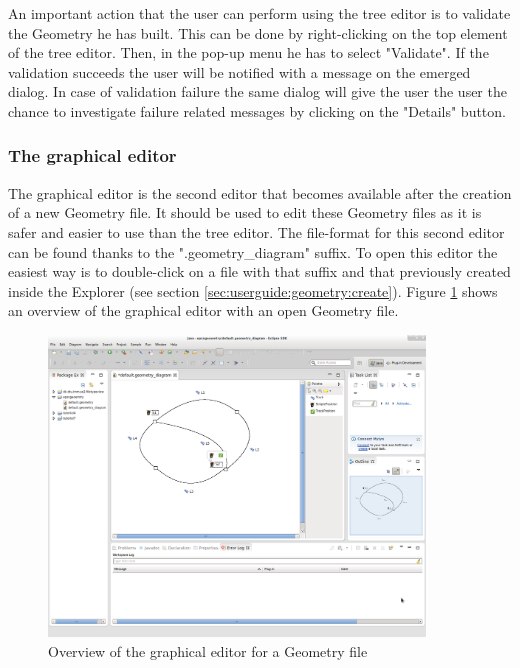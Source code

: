 An important action that the user can perform using the tree editor is to validate the Geometry he has built. This can be done by right-clicking on the top element of the tree editor. Then, in the pop-up menu he has to select "Validate". If the validation succeeds the user will be notified with a message on the emerged dialog. In case of validation failure the same dialog will give the user the user the chance to investigate failure related messages by clicking on the "Details" button. 

\subsubsection{The graphical editor}
\label{sec:userguide:geometry:graphical}
The graphical editor is the second editor that becomes available after the creation of a new Geometry file. It should be used to edit these Geometry files as it is safer and easier to use than the tree editor. The file-format for this second editor can be found thanks to the ".geometry\_diagram" suffix. To open this editor the easiest way is to double-click on a file with that suffix and that previously created inside the Explorer (see section \ref{sec:userguide:geometry:create}). Figure \ref{fig:geometry_overview} shows an overview of the graphical editor with an open Geometry file.

\begin{figure}[htp]
\begin{center}
  \includegraphics[width=10.0cm]{image/geometry_general.png}
  \caption{Overview of the graphical editor for a Geometry file}
  \label{fig:geometry_overview}
\end{center}
\end{figure}

